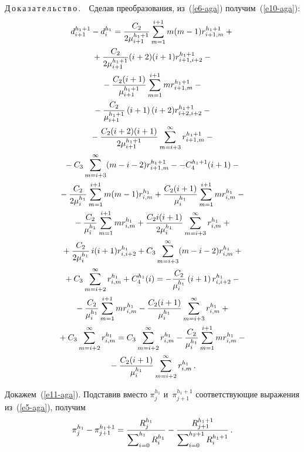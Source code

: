 \begin{multicols}{2}
  \noindent
  Д\,о\,к\,а\,з\,а\,т\,е\,л\,ь\,с\,т\,в\,о\,.\ \ Сделав преобразования, 
из~(\ref{e6-aga}) получим~(\ref{e10-aga}):
  \begin{multline*}
  d_{i+1}^{h_1+1} -d_i^{h_1} = \displaystyle\frac{\displaystyle C_2\mathstrut}{\displaystyle 2\mu_{i+1}^{h_1+1}\mathstrut} 
\sum\limits_{m=1}^{i+1} m(m-1) r^{h_1+1}_{i+1,m}+ {}\\
{}+
\displaystyle\frac{\displaystyle C_2\mathstrut}{\displaystyle 2\mu_{i+1}^{h_1+1}\mathstrut} (i+2)(i+1) r^{h_1+1}_{i+1,i+2}-{}\\
  {}-  \displaystyle\frac{\displaystyle C_2(i+1)\mathstrut}{\displaystyle \mu_{i+1}^{h_1+1}\mathstrut} \sum\limits_{m=1}^{i+1} 
mr_{i+1,m}^{h_1+1} -{}\\
{}-\displaystyle\frac{\displaystyle C_2\mathstrut}{\displaystyle \mu_{i+1}^{h_1+1}\mathstrut}\left(i+1\right) (i+2) 
r^{h_1+1}_{i+2,i+2}-{}\\
  {}-  \displaystyle\frac{\displaystyle C_2(i+2)(i+1)\mathstrut}{\displaystyle 2\mu_{i+1}^{h_1+1}\mathstrut} \sum\limits^\infty_{m=i+3} 
r^{h_1+1}_{i+1,m} -{}\\
{}-C_3\sum\limits^\infty_{m=i+3} (m-i-2) r_{i+1,m}^{h_1+1}-
- C_4^{h_1+1} (i+1) -{}\\
{}-\displaystyle\frac{\displaystyle C_2\mathstrut}{\displaystyle 2\mu_i^{h_1}\mathstrut} \sum\limits_{m=1}^{i+1} m(m-1) r^{h_1}_{i,m} +
\displaystyle\frac{\displaystyle C_2(i+1)\mathstrut}{\displaystyle \mu_i^{h_1}\mathstrut} \sum\limits_{m=1}^{i+1} mr^{h_1}_{i,m} -{}\\
  {}- \displaystyle\frac{\displaystyle C_2\mathstrut}{\displaystyle \mu_i^{h_1}\mathstrut} \sum\limits_{m=1}^{i+1} mr^{h_1}_{i,m} +
  \displaystyle\frac{\displaystyle C_2 i (i+1)\mathstrut}{\displaystyle 2\mu_i^{h_1}\mathstrut} \sum\limits^\infty_{m=i+3} r^{h_1}_{i,m} + {}\\
  {}+
\displaystyle\frac{\displaystyle C_2\mathstrut}{\displaystyle 2\mu_i^{h_1}\mathstrut} \, i(i+1) r^{h_1}_{i,i+2}+ C_3\sum\limits^\infty_{m=i+3} (m-i-2) r^{h_1}_{i,m} 
+{}\\
{}+
C_3\sum\limits^\infty_{m=i+2} r^{h_1}_{i,m} +C_4^{h_1}(i)=
 -\displaystyle\frac{\displaystyle C_2\mathstrut}{\displaystyle \mu_i^{h_1}\mathstrut}\left(i+1\right) r^{h_1}_{i,i+2} -{}\\
 {}-\displaystyle\frac{\displaystyle C_2\mathstrut}{\displaystyle \mu_i^{h_1}\mathstrut}
\sum\limits_{m=1}^{i+1} mr^{h_1}_{i,m} -\displaystyle\frac{\displaystyle C_2(i+1)\mathstrut}{\displaystyle \mu_i^{h_1}\mathstrut} 
\sum\limits^\infty_{m=i+3} r^{h_1}_{i,m}+{}\\
  {}+ C_3\sum\limits^\infty_{m=i+2} r^{h_1}_{i,m} 
=C_3\sum\limits^\infty_{m=i+2} r^{h_1}_{i,m} -\displaystyle\frac{\displaystyle C_2\mathstrut}{\displaystyle \mu_i^{h_1}\mathstrut} 
\sum\limits_{m=1}^{i+1} mr^{h_1}_{i,m} -{}\\
{}-\displaystyle\frac{\displaystyle C_2(i+1)\mathstrut}{\displaystyle \mu_i^{h_1}\mathstrut} 
\sum\limits^\infty_{m=i+2} r^{h_1}_{i,m}\,.
  \end{multline*}
  
  Докажем~(\ref{e11-aga}). Подставив вместо $\pi_j^{h_1}$ 
и~$\pi_{j+1}^{h_1+1}$ соответствующие выражения из~(\ref{e5-aga}), получим 
  \begin{equation}
  \pi_j^{h_1} -\pi_{j+1}^{h_1+1} =\fr{R_j^{h_1}}{\sum\nolimits^{h_1}_{i=0} 
R_i^{h_1}} - \fr{R_{j+1}^{h_1+1}}{\sum\nolimits_{i=0}^{h_2+1} 
R_i^{h_1+1}}\,.
  \label{e12-aga}
  \end{equation}
  

\end{multicols}
